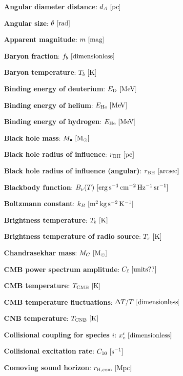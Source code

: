 \documentclass[a4paper,11pt]{article}
\begin{document}
{\noindent}\textbf{Angular diameter distance}: $d_A ~ [{\rm pc}]$

{\noindent}\textbf{Angular size}: $\theta ~ [{\rm rad}]$

{\noindent}\textbf{Apparent magnitude}: $m ~ [{\rm mag}]$

{\noindent}\textbf{Baryon fraction}: $f_b ~ [{\rm dimensionless}]$

{\noindent}\textbf{Baryon temperature}: $T_b ~ [{\rm K}]$

{\noindent}\textbf{Binding energy of deuterium}: $E_\mathrm{D} ~ [{\rm MeV}]$

{\noindent}\textbf{Binding energy of helium}: $E_\mathrm{He} ~ [{\rm MeV}]$

{\noindent}\textbf{Binding energy of hydrogen}: $E_\mathrm{He} ~ [{\rm MeV}]$

{\noindent}\textbf{Black hole mass}: $M_\bullet ~ [{\rm M_\odot}]$

{\noindent}\textbf{Black hole radius of influence}: $r_\mathrm{BH} ~ [{\rm pc}]$

{\noindent}\textbf{Black hole radius of influence (angular)}: $r_\mathrm{BH} ~ [{\rm arcsec}]$

{\noindent}\textbf{Blackbody function}: $B_\nu(T) ~ [{\rm erg\,s^{-1}\,cm^{-2}\,Hz^{-1}\,sr^{-1}}]$

{\noindent}\textbf{Boltzmann constant}: $k_B ~ [{\rm m^2\,kg\,s^{-2}\,K^{-1}}]$

{\noindent}\textbf{Brightness temperature}: $T_b ~ [{\rm K}]$

{\noindent}\textbf{Brightness temperature of radio source}: $T_r ~ [{\rm K}]$

{\noindent}\textbf{Chandrasekhar mass}: $M_C ~ [{\rm M_\odot}]$

{\noindent}\textbf{CMB power spectrum amplitude}: $C_\ell ~ [{\rm units??}]$

{\noindent}\textbf{CMB temperature}: $T_\mathrm{CMB} ~ [{\rm K}]$

{\noindent}\textbf{CMB temperature fluctuations}: $\Delta T/T ~ [{\rm dimensionless}]$

{\noindent}\textbf{CNB temperature}: $T_\mathrm{CNB} ~ [{\rm K}]$

{\noindent}\textbf{Collisional coupling for species $i$}: $x_c^i ~ [{\rm
dimensionless}]$

{\noindent}\textbf{Collisional excitation rate}: $C_{10} ~ [{\rm s^{-1}}]$

{\noindent}\textbf{Comoving sound horizon}: $r_\mathrm{H,com} ~ [{\rm Mpc}]$
\end{document}
